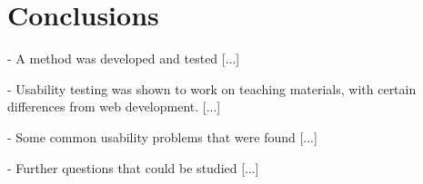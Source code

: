 \chapter{Conclusions}

- A method was developed and tested [...]

- Usability testing was shown to work on teaching materials, with certain differences from web development. [...]

- Some common usability problems that were found [...]

- Further questions that could be studied [...]
